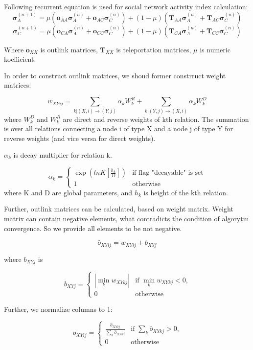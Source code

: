\documentclass[a4paper,12pt]{article}
\begin{document}
Following recurrent equation is used for social network activity index calculation:
$$
    \boldsymbol{\sigma}^{(n+1)}_A = \mu (\boldsymbol{o}_{AA} \boldsymbol{\sigma}^{(n)}_A + \boldsymbol{o}_{AC} \boldsymbol{\sigma}^{(n)}_C) + (1-\mu) (\boldsymbol{T}_{AA} \boldsymbol{\sigma}^{(n)}_A + \boldsymbol{T}_{AC} \boldsymbol{\sigma}^{(n)}_C)
$$
$$
    \boldsymbol{\sigma}^{(n+1)}_C = \mu (\boldsymbol{o}_{CA} \boldsymbol{\sigma}^{(n)}_A + \boldsymbol{o}_{CC} \boldsymbol{\sigma}^{(n)}_C) + (1-\mu) (\boldsymbol{T}_{CA} \boldsymbol{\sigma}^{(n)}_A + \boldsymbol{T}_{CC} \boldsymbol{\sigma}^{(n)}_C)
$$

Where $\boldsymbol{o}_{XX}$ is outlink matrices, $\boldsymbol{T}_{XX}$ is teleportation matrices, $\mu$ is numeric koefficient.

In order to construct outlink matrices, we shoud former constrruct weight matrices:

$$
    w_{XYij} = \sum_{k|(X,i) \to (Y,j)} \alpha_k W^R_k + \sum_{k|(Y,j) \to (X,i)} \alpha_k W^D_k
$$
where $W^D_k$ and $W^R_k$ are direct and reverse weights of kth relation. The summation is over all relations connecting a node i of type X and a node j of type Y for reverse weights (and vice versa for direct weights).

$\alpha_k$ is decay multiplier for relation k. 

$$
\alpha_k = \begin{cases}
 \exp{(lnK [\frac{h_k}{D}])}
 & \text{if flag "decayable" is set}\\
 1 & \text{otherwise}
\end{cases} 
$$
where K and D are global parameters, and $h_k$ is height of the kth relation.

Further, outlink matrices can be calculated, based on weight matrix. Weight matrix can contain negative elements, what contradicts the condition of algorytm convergence. So we provide all elements to be not negative.

$$
\hat{o}_{XYij} = w_{XYij} + b_{XYj}
$$

where $b_{XYj}$ is

$$
b_{XYj} = \begin{cases}
 |\min_k w_{XYkj}|
 & \text {if $\min_k w_{XYkj} < 0$,}\\
 0 & \text{otherwise}
\end{cases} 
$$

Further, we normalize columns to 1:

$$
o_{XYij} = \begin{cases}
 \frac{\hat{o}_{XYij}} {\sum\limits_{k} \hat{o}_{XYkj}}
 & \text{if $\sum\limits_{k} \hat{o}_{XYkj}> 0$,}\\
 0 & \text{otherwise}
\end{cases} 
$$
\end{document}
